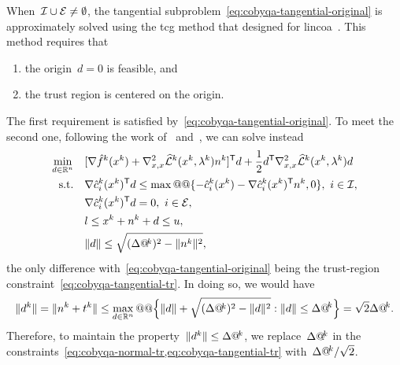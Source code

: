 When~$\mathcal{I} \cup \mathcal{E} \neq \emptyset$, the tangential subproblem~\cref{eq:cobyqa-tangential-original} is approximately solved using the \gls{tcg} method that \citeauthor{Powell_2015} designed for \gls{lincoa}~\cite{Powell_2015}.
This method requires that
\begin{enumerate}
    \item the origin~$d = 0$ is feasible, and
    \item the trust region is centered on the origin.
\end{enumerate}
The first requirement is satisfied by~\cref{eq:cobyqa-tangential-original}.
To meet the second one, following the work of~\cite[Eq.~(2.10)]{Lalee_Nocedal_Plantenga_1998} and~\cite[Eq.~(15.4.3)]{Conn_Gould_Toint_2000}, we can solve instead
\begin{subequations}
    \label{eq:cobyqa-tangential}
    \begin{align}
        \min_{\step \in \R^n}   & \quad [\nabla \objm[k](\iter[k]) + \nabla_{x, x}^2 \lagm[k](\iter[k], \lm[k]) \nstep[k]]^{\T} \step + \frac{1}{2} \step^{\T} \nabla_{x, x}^2 \lagm[k](\iter[k], \lm[k]) \step\\
        \text{s.t.}             & \quad \nabla \conm[k]{i}(\iter[k])^{\T} \step \le \max @@ \set{-\conm[k]{i}(\iter[k]) - \nabla \conm[k]{i}(\iter[k])^{\T} \nstep[k], 0}, ~ i \in \iub, \label{eq:cobyqa-tangential-ub}\\
                                & \quad \nabla \conm[k]{i}(\iter[k])^{\T} \step = 0, ~ i \in \ieq, \label{eq:cobyqa-tangential-eq}\\
                                & \quad \xl \le \iter[k] + \nstep[k] + \step \le \xu,\\
                                & \quad \norm{\step} \le \sqrt{(\rad[k])^2 - \norm{\nstep[k]}^2}, \label{eq:cobyqa-tangential-tr}
    \end{align}
\end{subequations}
the only difference with~\cref{eq:cobyqa-tangential-original} being the trust-region constraint~\cref{eq:cobyqa-tangential-tr}.
In doing so, we would have
\begin{equation*}
    \norm{\step[k]} = \norm{\nstep[k] + \tstep[k]} \le \max_{d \in \R^n} @@ \set[\Big]{\norm{d} + \sqrt{(\rad[k])^2 - \norm{\step}^2} : \norm{d} \le \rad[k]} = \sqrt{2} \rad[k].
\end{equation*}
Therefore, to maintain the property~$\norm{\step[k]} \le \rad[k]$, we replace~$\rad[k]$ in the constraints~\cref{eq:cobyqa-normal-tr,eq:cobyqa-tangential-tr} with~$\rad[k] / \sqrt{2}$.

